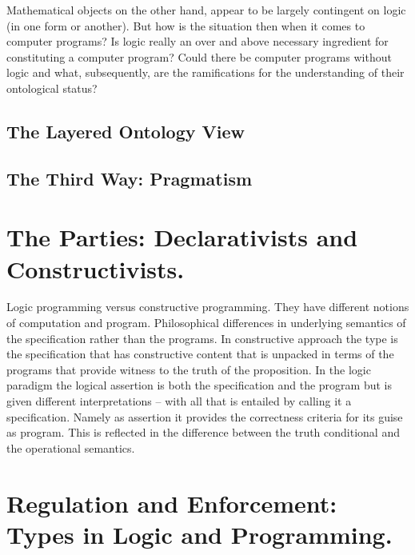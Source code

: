 \documentclass[]{article}
\begin{document}
Mathematical objects on the other hand, appear to be largely contingent on logic (in one form or another). But how is the situation then when it comes to computer programs? Is logic really an over and above necessary ingredient for constituting a computer program? Could there be computer programs without logic and what, subsequently, are the ramifications for the understanding of their ontological status?

\subsection{The Layered Ontology View}


{\color{red}{this passage follows on Nicola's and Giuseppe's work for SEP}}

\subsection{The Third Way: Pragmatism}


{\color{red}{this passage does not exist. A student of mine is doing some work in this direction, wonder whether we should explore.}}



\section{The Parties: Declarativists and Constructivists.}


{\color{red}{Ray's}}

Logic programming versus constructive programming. They have different notions of computation and program. Philosophical differences in underlying semantics of the specification rather than the programs. In constructive approach the type is the specification that has constructive content that is unpacked in terms of the programs that provide witness to the truth of the proposition. In the logic paradigm the logical assertion is both the specification and the program but is given different interpretations – with all that is entailed by calling it a specification. Namely as assertion it provides the correctness criteria for its guise as program. This is reflected in the difference between the truth conditional and the operational semantics.



\section{Regulation and Enforcement: Types in Logic and Programming.}
\end{document}

